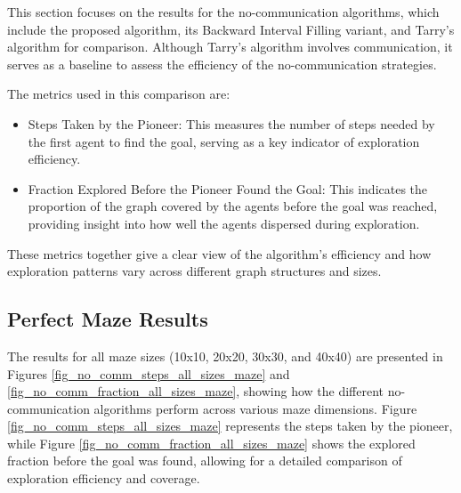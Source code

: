 This section focuses on the results for the no-communication algorithms, which include the proposed algorithm, its Backward Interval Filling variant, and Tarry's algorithm for comparison. Although Tarry's algorithm involves communication, it serves as a baseline to assess the efficiency of the no-communication strategies.


The metrics used in this comparison are:

\begin{itemize}
    \item Steps Taken by the Pioneer: This measures the number of steps needed by the first agent to find the goal, serving as a key indicator of exploration efficiency.
    \item Fraction Explored Before the Pioneer Found the Goal: This indicates the proportion of the graph covered by the agents before the goal was reached, providing insight into how well the agents dispersed during exploration.
\end{itemize}
    
These metrics together give a clear view of the algorithm's efficiency and how exploration patterns vary across different graph structures and sizes.

\subsection{Perfect Maze Results} 
\label{subsection_no_comm_maze_results}


The results for all maze sizes (10x10, 20x20, 30x30, and 40x40) are presented in Figures \ref{fig_no_comm_steps_all_sizes_maze} and \ref{fig_no_comm_fraction_all_sizes_maze}, showing how the different no-communication algorithms perform across various maze dimensions. Figure \ref{fig_no_comm_steps_all_sizes_maze} represents the steps taken by the pioneer, while Figure \ref{fig_no_comm_fraction_all_sizes_maze} shows the explored fraction before the goal was found, allowing for a detailed comparison of exploration efficiency and coverage.


